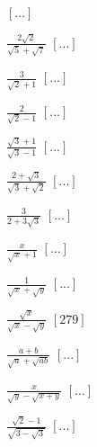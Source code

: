 \begin{esercizio}
\begin{multicols}{4}
\begin{enumeratea}
  \hfill $\left[...\right]$
 \item $\frac{2\sqrt 2}{\sqrt 5+\sqrt 7}$
  \hfill $\left[...\right]$
 \item $\frac 3{\sqrt 2+1}$
  \hfill $\left[...\right]$
 \item $\frac 2{\sqrt 2-1}$
  \hfill $\left[...\right]$
 \item $\frac{\sqrt 3+1}{\sqrt 3-1}$
  \hfill $\left[...\right]$
 \item $\frac{2+\sqrt 3}{\sqrt 3+\sqrt 2}$
  \hfill $\left[...\right]$
 \item $\frac 3{2+3\sqrt 3}$
  \hfill $\left[...\right]$
 \item $\frac x{\sqrt x+1}$
  \hfill $\left[...\right]$
 \item $\frac 1{\sqrt x+\sqrt y}$
  \hfill $\left[...\right]$
 \item $\frac{\sqrt x}{\sqrt x-\sqrt y}$
  \hfill $\left[279\right]$
 \item $\frac{a+b}{\sqrt a+\sqrt{ab}}$
  \hfill $\left[...\right]$
 \item $\frac x{\sqrt y-\sqrt{x+y}}$
  \hfill $\left[...\right]$
 \item $\frac{\sqrt 2-1}{\sqrt{3-\sqrt 3}}$
  \hfill $\left[...\right]$
 \end{enumeratea}
 \end{multicols}
\end{esercizio}


